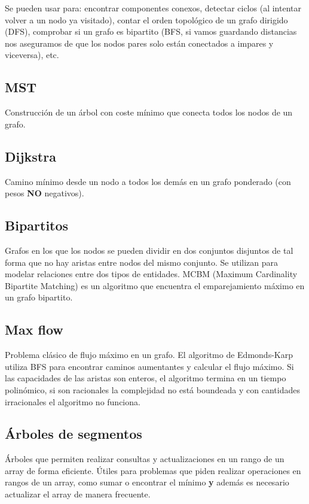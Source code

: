 Se pueden usar para: encontrar componentes conexos, detectar ciclos (al intentar volver
a un nodo ya visitado), contar el orden topológico de un grafo dirigido (DFS),
comprobar si un grafo es bipartito (BFS, si vamos guardando distancias nos aseguramos de
que los nodos pares solo están conectados a impares y viceversa), etc.


\subsection{MST}
Construcción de un árbol con coste mínimo que conecta todos los nodos de un grafo.

\subsection{Dijkstra}
Camino mínimo desde un nodo a todos los demás en un grafo ponderado (con pesos
\textbf{NO} negativos).


\subsection{Bipartitos}
Grafos en los que los nodos se pueden dividir en dos conjuntos disjuntos de tal
forma que no hay aristas entre nodos del mismo conjunto. Se utilizan para
modelar relaciones entre dos tipos de entidades. MCBM (Maximum Cardinality
Bipartite Matching) es un algoritmo que encuentra el emparejamiento máximo en un
grafo bipartito.

\subsection{Max flow}
Problema clásico de flujo máximo en un grafo. El algoritmo de Edmonds-Karp
utiliza BFS para encontrar caminos aumentantes y calcular el flujo máximo.
Si las capacidades de las aristas son enteros, el algoritmo termina en un
tiempo polinómico, si son racionales la complejidad no está boundeada y
con cantidades irracionales el algoritmo no funciona.

\subsection{Árboles de segmentos}
Árboles que permiten realizar consultas y actualizaciones en un rango de un
array de forma eficiente. Útiles para problemas que piden realizar operaciones
en rangos de un array, como sumar o encontrar el mínimo \textbf{y} además es
necesario actualizar el array de manera frecuente.



